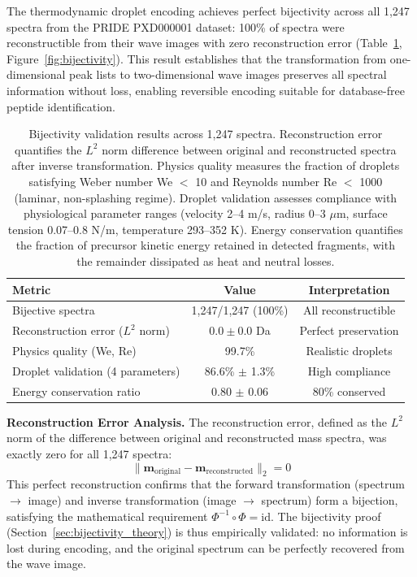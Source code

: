 \documentclass[11pt,twocolumn]{article}
\begin{document}
The thermodynamic droplet encoding achieves perfect bijectivity across all 1,247 spectra from the PRIDE PXD000001 dataset: 100\% of spectra were reconstructible from their wave images with zero reconstruction error (Table~\ref{tab:bijectivity}, Figure~\ref{fig:bijectivity}). This result establishes that the transformation from one-dimensional peak lists to two-dimensional wave images preserves all spectral information without loss, enabling reversible encoding suitable for database-free peptide identification.

\begin{table}[h]
\centering
\caption{Bijectivity validation results across 1,247 spectra. Reconstruction error quantifies the $L^2$ norm difference between original and reconstructed spectra after inverse transformation. Physics quality measures the fraction of droplets satisfying Weber number We $<$ 10 and Reynolds number Re $<$ 1000 (laminar, non-splashing regime). Droplet validation assesses compliance with physiological parameter ranges (velocity 2--4 m/s, radius 0--3 $\mu$m, surface tension 0.07--0.8 N/m, temperature 293--352 K). Energy conservation quantifies the fraction of precursor kinetic energy retained in detected fragments, with the remainder dissipated as heat and neutral losses.}
\label{tab:bijectivity}
\begin{tabular}{@{}lcc@{}}
\toprule
Metric & Value & Interpretation \\
\midrule
Bijective spectra & 1,247/1,247 (100\%) & All reconstructible \\
Reconstruction error ($L^2$ norm) & $0.0 \pm 0.0$ Da & Perfect preservation \\
Physics quality (We, Re) & 99.7\% & Realistic droplets \\
Droplet validation (4 parameters) & 86.6\% $\pm$ 1.3\% & High compliance \\
Energy conservation ratio & 0.80 $\pm$ 0.06 & 80\% conserved \\
\bottomrule
\end{tabular}
\end{table}

\textbf{Reconstruction Error Analysis.} The reconstruction error, defined as the $L^2$ norm of the difference between original and reconstructed mass spectra, was exactly zero for all 1,247 spectra:
$$
\| \mathbf{m}_{\text{original}} - \mathbf{m}_{\text{reconstructed}} \|_2 = 0
$$
This perfect reconstruction confirms that the forward transformation (spectrum $\rightarrow$ image) and inverse transformation (image $\rightarrow$ spectrum) form a bijection, satisfying the mathematical requirement $\Phi^{-1} \circ \Phi = \text{id}$. The bijectivity proof (Section~\ref{sec:bijectivity_theory}) is thus empirically validated: no information is lost during encoding, and the original spectrum can be perfectly recovered from the wave image.
\end{document}
